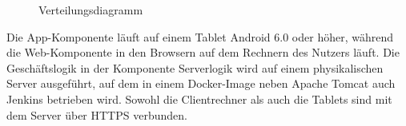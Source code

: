 \begin{figure}[h]
	\centering
	\caption{Verteilungsdiagramm}
	\label{fig:verteilungsdiagramm}
\end{figure}
\noindent
Die App-Komponente läuft auf einem Tablet Android 6.0 oder höher, während 
die Web-Komponente  in den Browsern auf dem Rechnern des Nutzers läuft.
Die Geschäftslogik in der Komponente Serverlogik wird auf einem physikalischen Server ausgeführt, auf dem in einem Docker-Image neben Apache Tomcat auch Jenkins betrieben wird.
Sowohl die Clientrechner als auch die Tablets sind mit dem Server über HTTPS verbunden.
